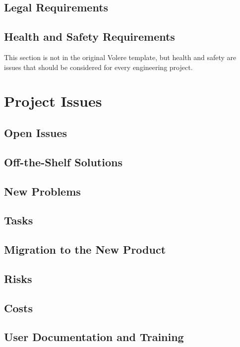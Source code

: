 \documentclass[11pt]{article}
\begin{document}
\subsection{Legal Requirements}

\subsection{Health and Safety Requirements}

This section is not in the original Volere template, but health and safety are
issues that should be considered for every engineering project.

\section{Project Issues}

\subsection{Open Issues}

\subsection{Off-the-Shelf Solutions}

\subsection{New Problems}

\subsection{Tasks}

\subsection{Migration to the New Product}

\subsection{Risks}

\subsection{Costs}

\subsection{User Documentation and Training}
\end{document}
